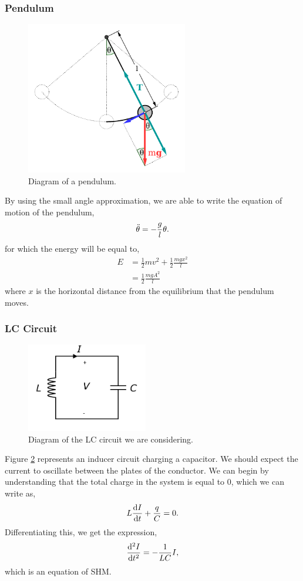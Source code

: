 \documentclass{book}
\begin{document}
\subsubsection{Pendulum}
\begin{figure}[h]
        \centering
        \includegraphics[width=200pt]{pendulum.pdf}
        \caption{Diagram of a pendulum.}
        \label{fig:pendulum}
\end{figure}
\noindent
By using the small angle approximation, we are able to write the equation of motion of the pendulum,
\begin{equation}
    \Ddot{\theta} = -\frac{g}{l}\theta.
\end{equation}
for which the energy will be equal to,
\begin{equation}
    \begin{split}
        E & = \frac{1}{2}mv^2 + \frac{1}{2}\frac{mgx^2}{l} \\
        & = \frac{1}{2}\frac{mgA^2}{l}
    \end{split}
\end{equation}
where $x$ is the horizontal distance from the equilibrium that the pendulum moves.
\subsubsection{LC Circuit}
\begin{figure}[h]
    \centering
    \includegraphics[width=150pt]{LC.pdf}
    \caption{Diagram of the LC circuit we are considering.}
    \label{fig:LC}
\end{figure}
Figure \ref{fig:LC} represents an inducer circuit charging a capacitor. We should expect the current to oscillate between the plates of the conductor. We can begin by understanding that the total charge in the system is equal to 0, which we can write as,
\begin{equation}
    L\dv{I}{t} + \frac{q}{C} = 0.
\end{equation}
Differentiating this, we get the expression,
\begin{equation}
    \dv[2]{I}{t} = -\frac{1}{LC}I,
\end{equation}
which is an equation of SHM.
\end{document}
